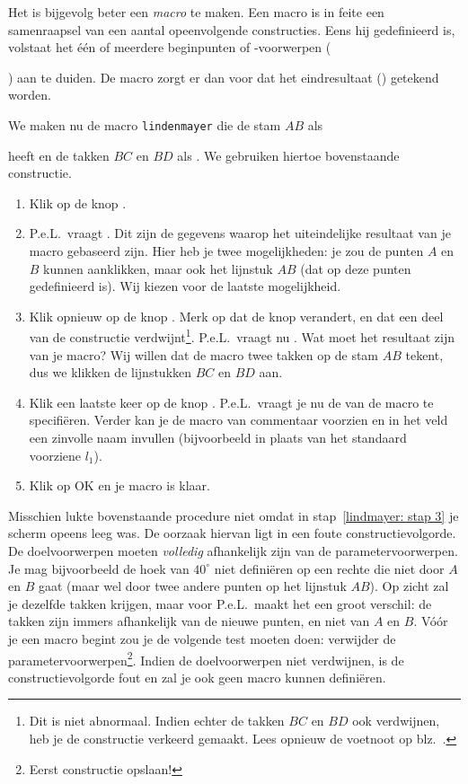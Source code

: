 Het is bijgevolg beter een {\it macro} te maken. Een macro is in feite een samenraapsel van een aantal opeenvolgende constructies. Eens hij gedefinieerd is, volstaat het \'e\'en of meerdere beginpunten of -voorwerpen ({) aan te duiden. De macro zorgt er dan voor dat het eindresultaat () getekend worden.

We maken nu de macro {\tt lindenmayer} die de stam $AB$ als { heeft en de takken $BC$ en $BD$ als . We gebruiken hiertoe bovenstaande constructie.

\begin{enumerate}
\item Klik op de knop .
\item P.e.L.\ vraagt . Dit zijn de gegevens waarop het uiteindelijke resultaat van je macro gebaseerd zijn. Hier heb je twee mogelijkheden: je zou de punten $A$ en $B$ kunnen aanklikken, maar ook het lijnstuk $AB$ (dat op deze punten gedefinieerd is). Wij kiezen voor de laatste mogelijkheid.
\item \label{lindmayer: stap 3} Klik opnieuw op de knop . Merk op dat de knop verandert, en dat een deel van de constructie verdwijnt\footnote{Dit is niet abnormaal. Indien echter de takken $BC$ en $BD$ ook verdwijnen, heb je de constructie verkeerd gemaakt. Lees opnieuw de voetnoot op blz.~\pageref{voetnoot_lindmayer}.}. P.e.L.\ vraagt nu . Wat moet het resultaat zijn van je macro? Wij willen dat de macro twee takken op de stam $AB$ tekent, dus we klikken de lijnstukken $BC$ en $BD$ aan.
\item Klik een laatste keer op de knop . P.e.L.\ vraagt je nu de  van de macro te specifi\"eren. Verder kan je de macro van commentaar voorzien en in het veld  een zinvolle naam invullen (bijvoorbeeld  in plaats van het standaard voorziene $l_1$).
\item Klik op OK en je macro is klaar.
\end{enumerate}

Misschien lukte bovenstaande procedure niet omdat in stap~\ref{lindmayer: stap 3} je scherm opeens leeg was. De oorzaak hiervan ligt in een foute constructievolgorde. De doelvoorwerpen moeten {\it volledig} afhankelijk zijn van de parametervoorwerpen. Je mag bijvoorbeeld de hoek van $40^\circ$ niet defini\"eren op een rechte die niet door $A$ en $B$ gaat (maar wel door twee andere punten op het lijnstuk $AB$). Op zicht zal je dezelfde takken krijgen, maar voor P.e.L.\ maakt het een groot verschil: de takken zijn immers afhankelijk van de nieuwe punten, en niet van $A$ en $B$. V\'o\'or je een macro begint zou je de volgende test moeten doen: verwijder de parametervoorwerpen\footnote{Eerst constructie opslaan!}. Indien de doelvoorwerpen niet verdwijnen, is de constructievolgorde fout en zal je ook geen macro kunnen defini\"eren.

}}
